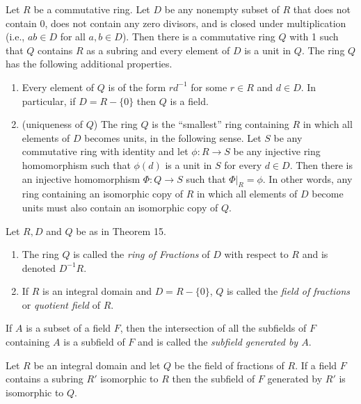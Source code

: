 \documentclass[../main]{subfiles}
\begin{document}
\begin{thm}
 Let $R$ be a commutative ring. Let $D$ be any nonempty subset of $R$ that does not contain 0, does not contain any zero divisors, and is closed under multiplication (i.e., $ab \in D$ for all $a,b \in D$). Then there is a commutative ring $Q$ with 1 such that $Q$ contains $R$ as a subring and every element of $D$ is a unit in $Q$. The ring $Q$ has the following additional properties.
 \begin{enumerate}
  \item Every element of $Q$ is of the form $r d^{-1}$ for some $r \in R$ and $d\in D$. In particular, if $D = R-\{0\}$ then $Q$ is a field.
  
  \item (uniqueness of $Q$) The ring $Q$ is the ``smallest'' ring containing $R$ in which all elements of $D$ becomes units, in the following sense. Let $S$ be any commutative ring with identity and let $\phi \colon R \to S$ be any injective ring homomorphism such that $\phi(d)$ is a unit in $S$ for every $d\in D$. Then there is an injective homomorphism $\Phi \colon Q \to S$ such that $\Phi|_R = \phi$. In other words, any ring containing an isomorphic copy of $R$ in which all elements of $D$ become units must also contain an isomorphic copy of $Q$.
 \end{enumerate}
\end{thm}


\begin{dfn}
 Let $R, D$ and $Q$ be as in Theorem 15.
 \begin{enumerate}
  \item The ring $Q$ is called the \textit{ring of Fractions} of $D$ with respect to $R$ and is denoted $D^{-1}R$.
  
  \item If $R$ is an integral domain and $D = R - \{0\}$, $Q$ is called the \textit{field of fractions} or \textit{quotient field} of $R$.
 \end{enumerate}
\end{dfn}


\begin{nt}
 If $A$ is a subset of a field $F$, then the intersection of all the subfields of $F$ containing $A$ is a subfield of $F$ and is called the \textit{subfield generated by $A$}.
\end{nt}


\begin{cor}
 Let $R$ be an integral domain and let $Q$ be the field of fractions of $R$. If a field $F$ contains a subring $R'$ isomorphic to $R$ then the subfield of $F$ generated by $R'$ is isomorphic to $Q$.
\end{cor}
\end{document}
